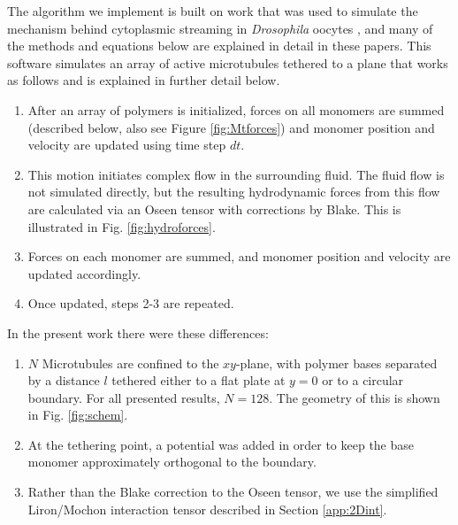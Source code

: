 \documentclass[11pt]{ucthesis}
\begin{document}
The algorithm we implement is built on work that was used to
simulate the mechanism behind cytoplasmic streaming in \textit{Drosophila}
oocytes \cite{Monteith2016}, and many of the methods and equations
below are explained in detail in these papers. This software simulates
an array of active microtubules tethered to a plane that works as follows
and is explained in further detail below.
\begin{enumerate}
\item After an array of polymers is initialized, forces on all
monomers are summed (described below, also see Figure
\ref{fig:Mtforces}) and monomer position and
velocity are updated using time step $dt$.
\item This motion initiates complex flow in the surrounding fluid.
The fluid flow is not simulated directly, but the resulting
hydrodynamic forces from this flow are calculated via an Oseen
tensor with corrections by Blake\cite{Blake1971}. This is illustrated in Fig. \ref{fig:hydroforces}.
\item Forces on each monomer are summed, and monomer position and
velocity are updated accordingly.
\item Once updated, steps 2-3 are repeated.
\end{enumerate}
In the present work there were these differences: 
\begin{enumerate}
\item $N$ Microtubules are confined to the $xy$-plane, with polymer
bases separated by a distance $l$ tethered either to a flat plate
at $y=0$ or to a circular boundary. For all presented results,
$N=128$. The geometry of this is shown in Fig. \ref{fig:schem}.
\item At the tethering point, a potential was added in order to
keep the base monomer approximately orthogonal to the boundary.
\item Rather than the Blake correction to the Oseen tensor, we use
the simplified Liron/Mochon interaction tensor described in Section
\ref{app:2Dint}.
\end{enumerate}
\end{document}

